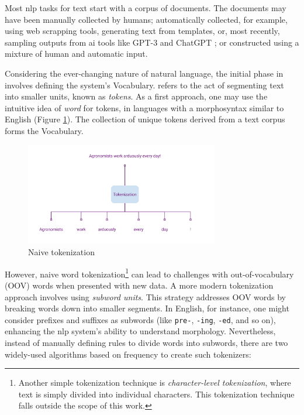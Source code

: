 \label{02_tokenization_and_embeddings}

Most \gls{nlp} tasks for text start with a corpus of documents. The documents may have been manually collected by humans; automatically collected, for example, using web scrapping tools, generating text from templates, or, most recently, sampling outputs from \gls{ai} tools like GPT-3  and ChatGPT ; or constructed using a mixture of human and automatic input.

Considering the ever-changing nature of natural language, the initial phase in \textclassification{} involves defining the system's Vocabulary. \emph{\tokenization{}} refers to the act of segmenting text into smaller units, known as \emph{tokens}. As a first approach, one may use the intuitive idea of \emph{word} for tokens, in languages with a morphosyntax similar to English (Figure \ref{fig:naive_tokenization}). The collection of unique tokens derived from a text corpus forms the Vocabulary.

\begin{figure}
    \centering
    \includegraphics[width=0.75\textwidth]{Figures/02/01_Naive_Tokenization.png}
    \caption{Naive tokenization}
    \label{fig:naive_tokenization}
\end{figure}

However, naive word tokenization\footnote{Another simple tokenization technique is \emph{character-level tokenization}, where text is simply divided into individual characters. This tokenization technique falls outside the scope of this work.} can lead to challenges with out-of-vocabulary (OOV) words when presented with new data. 
A more modern tokenization approach involves using \emph{subword units}. This strategy addresses OOV words by breaking words down into smaller segments. In English, for instance, one might consider prefixes and suffixes as subwords (like \texttt{pre-}, \texttt{-ing}, \texttt{-ed}, and so on), enhancing the \gls{nlp} system's ability to understand morphology. Nevertheless, instead of manually defining rules to divide words into subwords, there are two widely-used algorithms based on frequency to create such tokenizers:


